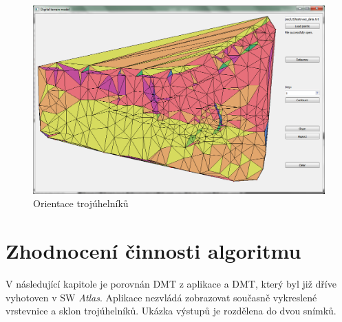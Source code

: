 \documentclass[a4paper, 12pt]{article}
\begin{document}
\begin{figure}[h!]
	\centering
	\includegraphics[width=15cm]{./pictures/app_aspect.png}
	\caption{Orientace trojúhelníků}
\end{figure}
\clearpage

\section{Zhodnocení činnosti algoritmu}
V následující kapitole je porovnán DMT z aplikace a DMT, který byl již dříve vyhotoven v SW \textit{Atlas}. Aplikace nezvládá zobrazovat současně vykreslené vrstevnice a sklon trojúhelníků. Ukázka výstupů je rozdělena do dvou snímků. 
\end{document}
